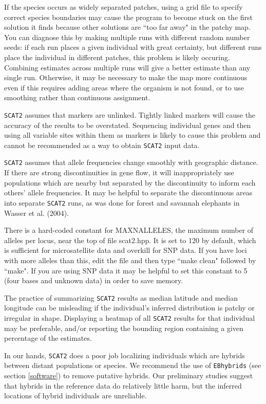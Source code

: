 \documentclass[10pt,titlepage,times,letterpaper]{article}
\def\SCAT{{\tt SCAT2} }
\begin{document}
If the species occurs as widely separated patches, using a grid file
to specify correct species boundaries may cause the program to become
stuck on the first solution it finds because other solutions are 
``too far away" in the patchy map.  You can diagnose this by making
multiple runs with different random number seeds:  if each run places a
given individual with great certainty, but different runs place the
individual in different patches, this problem is likely occuring.  Combining
estimates across multiple runs will give a better estimate than any
single run.  Otherwise, it may be necessary to make the map more continuous
even if this requires adding areas where the organism is not found, or to
use smoothing rather than continuous assignment.

\SCAT assumes that markers are unlinked.  Tightly linked markers will
cause the accuracy of the results to be overstated.  Sequencing individual
genes and then using all variable sites within them as markers is likely
to cause this problem and cannot be recommended as a way to obtain \SCAT
input data.

\SCAT assumes that allele frequencies change smoothly with geographic
distance.  If there are strong discontinuities in gene flow, it will
inappropriately use populations which are nearby but separated by the
discontinuity to inform each others' allele frequencies.  It may be
helpful to separate the discontinuous areas into separate \SCAT runs,
as was done for forest and savannah elephants in Wasser et al. (2004).

There is a hard-coded constant for MAXNALLELES, the maximum number
of alleles per locus, near the top of file scat2.hpp.  It is set to 120
by default, which is sufficient for microsatellite data and overkill for
SNP data.  If you have loci with more alleles than this, edit the
file and then type ``make clean" followed by ``make".  If you are using
SNP data it may be helpful to set this constant to 5 (four bases and unknown
data) in order to save memory.

The practice of summarizing \SCAT results as median latitude and
median longitude can be misleading if the individual's
inferred distribution is patchy or irregular in shape.  Displaying
a heatmap of all \SCAT results for that individual may be preferable,
and/or reporting the bounding region containing a given percentage
of the estimates.

In our hands, \SCAT does a poor job localizing individuals which are
hybrids between distant populations or species.  We recommend the use
of {\tt EBhybrids} (see section \ref{software}) to remove putative hybrids.
Our preliminary studies suggest that hybrids in the reference data do
relatively little harm, but the inferred locations of hybrid individuals are
unreliable. 
\end{document}
